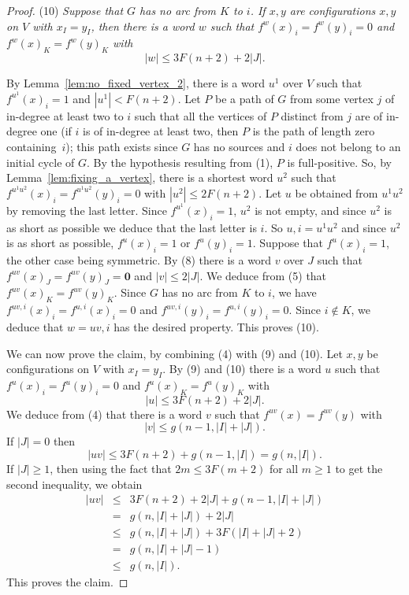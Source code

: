 \documentclass[11pt,letter]{article}
\newcommand{\ZERO}{{\mathbf{0}}}
\begin{document}
\begin{proof}
\bigskip
\noindent
(10) {\em Suppose that $G$ has no arc from $K$ to $i$. If $x,y$ are configurations $x,y$ on $V$ with $x_I=y_I$, then there is a word $w$ such that $f^w(x)_i=f^w(y)_i=0$ and $f^w(x)_K=f^w(y)_K$ with}
\[
|w|\leq 3F(n+2)+2|J|.
\]

\medskip
\noindent
By Lemma~\ref{lem:no_fixed_vertex_2}, there is a word $u^1$ over $V$ such that $f^{u^1}(x)_i=1$ and $|u^1|< F(n+2)$. Let $P$ be a path of $G$ from some vertex $j$ of in-degree at least two to $i$ such that all the vertices of $P$ distinct from $j$ are of in-degree one (if $i$ is of in-degree at least two, then $P$ is the path of length zero containing~$i$); this path exists since $G$ has no sources and $i$ does not belong to an initial cycle of $G$. By the hypothesis resulting from (1), $P$ is full-positive. So, by Lemma~\ref{lem:fixing_a_vertex}, there is a shortest word $u^2$ such that $f^{u^1u^2}(x)_i=f^{u^1u^2}(y)_i=0$ with $|u^2|\leq 2F(n+2)$. Let $u$ be obtained from $u^1u^2$ by removing the last letter. Since $f^{u^1}(x)_i=1$, $u^2$ is not empty, and since $u^2$ is as short as possible we deduce that the last letter is $i$. So $u,i=u^1u^2$ and since $u^2$ is as short as possible, $f^u(x)_i=1$ or $f^u(y)_i=1$. Suppose that $f^u(x)_i=1$, the other case being symmetric. By (8) there is a word $v$ over $J$ such that $f^{uv}(x)_J=f^{uv}(y)_J=\ZERO$ and $|v|\leq 2|J|$. We deduce from (5) that $f^{uv}(x)_K=f^{uv}(y)_K$. Since $G$ has no arc from $K$ to $i$, we have $f^{uv,i}(x)_i=f^{u,i}(x)_i=0$ and $f^{uv,i}(y)_i=f^{u,i}(y)_i=0$. Since $i\not\in K$, we deduce that $w=uv,i$ has the desired property. This proves (10).

\bigskip
We can now prove the claim, by combining (4) with (9) and (10). Let $x,y$ be configurations on $V$ with $x_I=y_I$. By (9) and (10) there is a word $u$ such that $f^u(x)_i=f^u(y)_i=0$ and $f^u(x)_K=f^u(y)_K$ with 
\[
|u|\leq 3F(n+2)+2|J|.
\]
We deduce from (4) that there is a word $v$ such that $f^{uv}(x)=f^{uv}(y)$ with 
\[
|v|\leq g(n-1,|I|+|J|).
\]
If $|J|=0$ then 
\[
|uv|\leq 3F(n+2)+g(n-1,|I|)=g(n,|I|).
\]
If $|J|\geq 1$, then using the fact that $2m\leq 3F(m+2)$ for all $m\geq 1$ to get the second inequality, we obtain 
\[
\begin{array}{rcl}
|uv|&\leq& 	3F(n+2)+2|J|+g(n-1,|I|+|J|) \\[1mm]
&=& 		g(n,|I|+|J|)+2|J| \\[1mm]
&\leq &		g(n,|I|+|J|)+3F(|I|+|J|+2)\\[1mm]
&=&			g(n,|I|+|J|-1)\\[1mm]
&\leq &		g(n,|I|).
\end{array}
\] 
This proves the claim. 
\end{proof}
\end{document}
